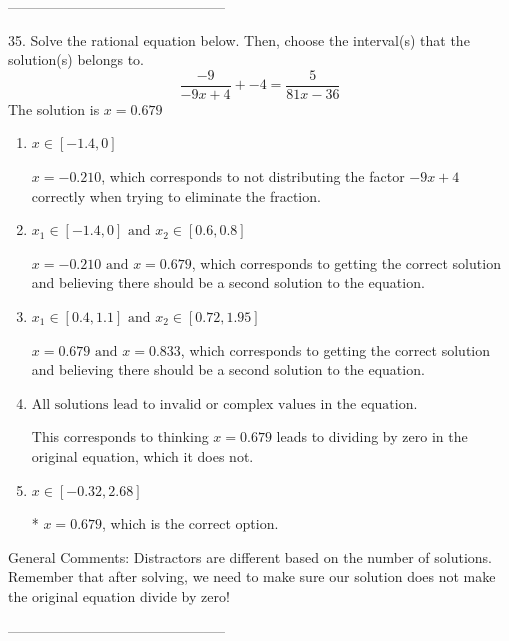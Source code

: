 \documentclass{extbook}[14pt]
\begin{document}
-----------------------------------------------

35. Solve the rational equation below. Then, choose the interval(s) that the solution(s) belongs to.
\[ \frac{-9}{-9x + 4} + -4 = \frac{5}{81x -36} \] 
The solution is $ x = 0.679 $ 

\begin{enumerate}[label=\Alph*.] 
\item $ x \in [-1.4,0] $ 

 $x = -0.210$, which corresponds to not distributing the factor $-9x + 4$ correctly when trying to eliminate the fraction. 
\item $ x_1 \in [-1.4, 0] \text{ and } x_2 \in [0.6,0.8] $ 

 $x = -0.210 \text{ and } x = 0.679$, which corresponds to getting the correct solution and believing there should be a second solution to the equation. 
\item $ x_1 \in [0.4, 1.1] \text{ and } x_2 \in [0.72,1.95] $ 

 $x = 0.679 \text{ and } x = 0.833$, which corresponds to getting the correct solution and believing there should be a second solution to the equation. 
\item $ \text{All solutions lead to invalid or complex values in the equation.} $ 

 This corresponds to thinking $x = 0.679$ leads to dividing by zero in the original equation, which it does not. 
\item $ x \in [-0.32,2.68] $ 

 * $x = 0.679$, which is the correct option. 
\end{enumerate} 
 
General Comments: Distractors are different based on the number of solutions. Remember that after solving, we need to make sure our solution does not make the original equation divide by zero!

-----------------------------------------------
\end{document}
